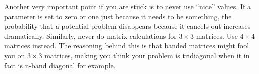 Another very important point if you are stuck is to never use ``nice'' values. 
If a parameter is set to zero or one just because it needs to be something, the probability that a potential problem disappears because it cancels out increases dramatically. 
Similarly, never do matrix calculations for $3\times 3$ matrices. Use $4\times4$ matrices instead. The reasoning behind this is that banded matrices might fool you on $3\times 3$ matrices, making you think your problem is tridiagonal when it in fact is n-band diagonal for example.